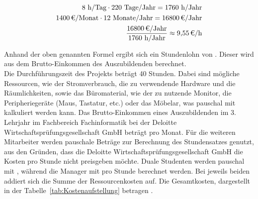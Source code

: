 \begin{eqnarray}
	8 \mbox{ h/Tag} \cdot 220 \mbox{ Tage/Jahr} = 1760 \mbox{ h/Jahr}\\
	\eur{1400}\mbox{/Monat} \cdot 12 \mbox{ Monate/Jahr} = \eur{16800} \mbox{/Jahr}\\
	\frac{\eur{16800} \mbox{/Jahr}}{1760 \mbox{ h/Jahr}} \approx \eur{9,55}\mbox{/h}
\end{eqnarray}

Anhand der oben genannten Formel ergibt sich ein Stundenlohn von . Dieser wird aus dem Brutto-Einkommen des Auszubildenden berechnet.
\\Die Durchführungszeit des Projekts beträgt 40 Stunden. 
Dabei sind mögliche Ressourcen, wie der Stromverbrauch, die zu verwendende Hardware und die Räumlichkeiten, sowie das Büromaterial, 
wie \zB der zu nutzende Monitor, die Peripheriegeräte (Maus, Tastatur, etc.) oder das Möbelar, was pauschal mit  kalkuliert werden kann. 
Das Brutto-Einkommen eines Auszubildenden im 3. Lehrjahr im Fachbereich Fachinformatik bei der Deloitte Wirtschaftsprüfungsgesellschaft GmbH 
beträgt  pro Monat. 
Für die weiteren Mitarbeiter werden pauschale Beträge zur Berechnung des Stundensatzes genutzt, aus den Gründen, dass die 
Deloitte Wirtschaftsprüfungsgesellschaft GmbH die Kosten pro Stunde nicht preisgeben möchte. Duale Studenten werden pauschal mit 
, während die Manager mit  pro Stunde berechnet werden. Bei jeweils beiden addiert sich die Summe der 
Ressourcenkosten auf. Die Gesamtkosten, dargestellt in der Tabelle~\ref{tab:Kostenaufstellung} betragen .


